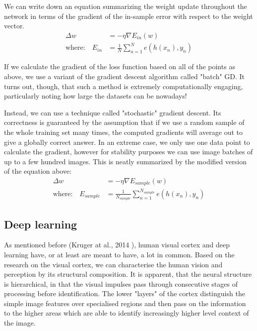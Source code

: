 \documentclass[a4paper, 12pt]{article}
\numberwithin{equation}{section}
\begin{document}
	We can write down an equation summarizing the weight update throughout the network in terms of the gradient of the in-sample error with respect to the weight vector.
	\begin{align}\label{weight_update}
	\Delta w &= - \eta \nabla E_{in}(w) \\
	\textrm{where:} \quad E_{in} &= \frac{1}{N} \sum_{n = 1}^{N} e(h(x_n), y_n)
	\end{align}
	
	If we calculate the gradient of the loss function based on all of the points as above, we use a variant of the gradient descent algorithm called "batch" GD. It turns out, though, that such a method is extremely computationally engaging, particularly noting how large the datasets can be nowadays!
	
	Instead, we can use a technique called "stochastic" gradient descent. Its correctness is guaranteed by the assumption that if we use a random sample of the whole training set many times, the computed gradients will average out to give a globally correct answer. In an extreme case, we only use one data point to calculate the gradient, however for stability purposes we can use image batches of up to a few hundred images. This is neatly summarized by the modified version of the equation above:
	\begin{align}
	\Delta w &= - \eta \nabla E_{sample}(w) \\
	\textrm{where:} \quad E_{sample} &= \frac{1}{N_{sample}} \sum_{n = 1}^{N_{sample}} e(h(x_n), y_n)
	\end{align}
	
	\subsection{Deep learning}
	
	As mentioned before (Kruger at al., 2014 \cite{kruger2013deep}), human visual cortex and deep learning have, or at least are meant to have, a lot in common. Based on the research on the visual cortex, we can characterise the human vision and perception by its structural composition. It is apparent, that the neural structure is hierarchical, in that the visual impulses pass through consecutive stages of processing before identification. The lower "layers" of the cortex distinguish the simple image features over specialised regions and then pass on the information to the higher areas which are able to identify increasingly higher level context of the image.
	
\end{document}
